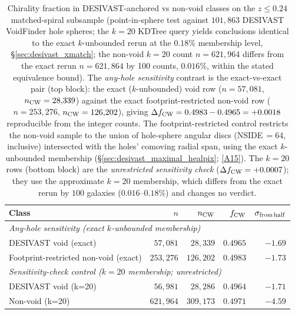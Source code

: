 \documentclass[twocolumn,linenumbers]{aastex702}
\newcommand{\repoBase}{https://github.com/Hubify-Projects/bigbounce/blob/main}
\begin{document}
\begin{table}[ht]
\caption{Chirality fraction in DESIVAST-anchored vs non-void classes
on the $z \leq 0.24$ matched-spiral subsample (point-in-sphere test
against $101{,}863$ DESIVAST VoidFinder hole spheres; the $k=20$
KDTree query yields conclusions identical to the exact $k$-unbounded
rerun at the $0.18\%$ membership level, \S\ref{sec:desivast_xmatch};
the non-void $k\!=\!20$ count $n=621{,}964$ differs from the exact
rerun $n=621{,}864$ by 100 counts, $0.016\%$, within the stated
equivalence bound).
The \emph{any-hole sensitivity} contrast is the exact-vs-exact pair (top block): the
exact ($k$-unbounded) void row ($n = 57{,}081$, $n_{\rm CW} = 28{,}339$)
against the exact footprint-restricted non-void row ($n = 253{,}276$,
$n_{\rm CW} = 126{,}202$), giving
$\Delta f_{\rm CW} = 0.4983 - 0.4965 = +0.0018$ reproducible from the
integer counts. The footprint-restricted control restricts the non-void
sample to the union of hole-sphere angular discs (NSIDE\,$=\!64$,
inclusive) intersected with the holes' comoving radial span, using the
exact $k$-unbounded membership
(\S\ref{sec:desivast_maximal_healpix};
\href{\repoBase/pipelines/p5\_desi\_chirality/outputs/29\_ext3\_desivast\_footprint\_retabulation.json}{[A15]}).
The $k=20$ rows (bottom block) are the \emph{unrestricted sensitivity
check} ($\Delta f_{\rm CW} = +0.0007$); they use the approximate $k=20$
membership, which differs from the exact rerun by $100$ galaxies
($0.016$--$0.18\%$) and changes no verdict.}
\label{tab:desivast_canonical}
\begin{ruledtabular}
\begin{tabular}{lrrrr}
Class & $n$ & $n_{\rm CW}$ & $f_{\rm CW}$ & $\sigma_{\rm from\,half}$ \\
\hline
\multicolumn{5}{l}{\textit{Any-hole sensitivity (exact $k$-unbounded membership)}} \\
DESIVAST void (exact) & $57{,}081$ & $28{,}339$ & $0.4965$ & $-1.69$ \\
Footprint-restricted non-void (exact) & $253{,}276$ & $126{,}202$ & $0.4983$ & $-1.73$ \\
\hline
\multicolumn{5}{l}{\textit{Sensitivity-check control ($k=20$ membership; unrestricted)}} \\
DESIVAST void (k=20) & $56{,}981$ & $28{,}286$ & $0.4964$ & $-1.71$ \\
Non-void (k=20)      & $621{,}964$ & $309{,}173$ & $0.4971$ & $-4.59$ \\
\end{tabular}
\end{ruledtabular}
\end{table}
\end{document}

